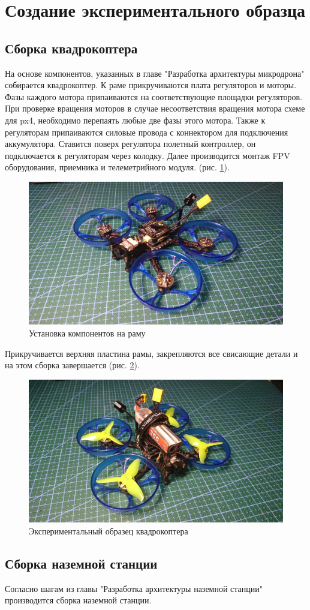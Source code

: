 
\section{Создание экспериментального образца}

\subsection{Сборка квадрокоптера}
На основе компонентов, указанных в главе "Разработка архитектуры микродрона" собирается квадрокоптер. К раме прикручиваются плата регуляторов и моторы. Фазы каждого мотора припаиваются на соответствующие площадки регуляторов. При проверке вращения моторов в случае несоответствия вращения мотора схеме для px4, необходимо перепаять любые две фазы этого мотора. Также к регуляторам припаиваются силовые провода с коннектором для подключения аккумулятора. Ставится поверх регулятора полетный контроллер, он подключается к регуляторам через колодку. Далее производится монтаж FPV оборудования, приемника и телеметрийного модуля. (рис. \ref{fig:quad1}).
\begin{figure}[H]
	\centering
	\includegraphics[width=0.5\linewidth]{pics/quad1}
	\caption{Установка компонентов на раму
	}
	\label{fig:quad1}
\end{figure}
Прикручивается верхняя пластина рамы, закрепляются все свисающие детали и на этом сборка завершается (рис. \ref{fig:quad2}).
\begin{figure}[H]
	\centering
	\includegraphics[width=0.5\linewidth]{pics/quad2}
	\caption{Экспериментальный образец квадрокоптера
	}
	\label{fig:quad2}
\end{figure}

\subsection{Сборка наземной станции}
Согласно шагам из главы "Разработка архитектуры наземной станции" производится сборка наземной станции.
